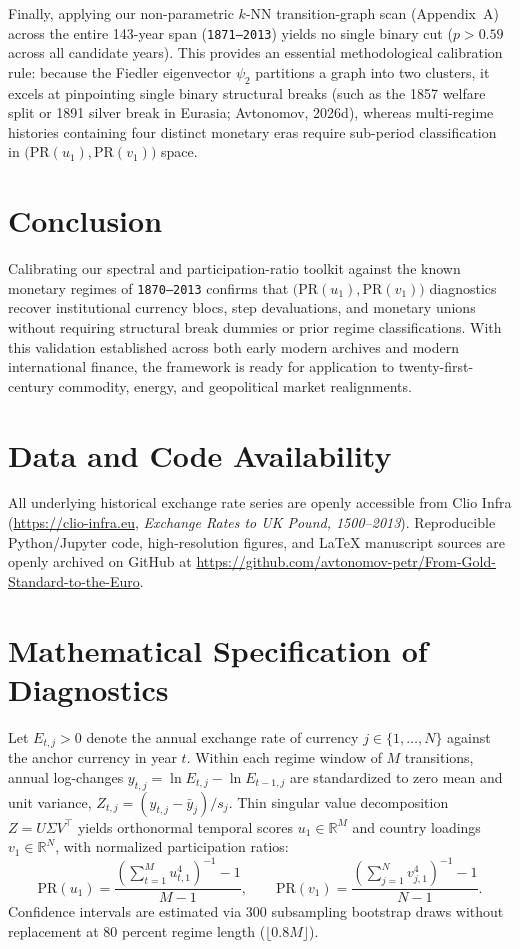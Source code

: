 \documentclass[11pt,a4paper]{article}
\begin{document}
Finally, applying our non-parametric $k$-NN transition-graph scan (Appendix~A) across the entire 143-year span (\texttt{1871--2013}) yields no single binary cut ($p > 0.59$ across all candidate years). This provides an essential methodological calibration rule: because the Fiedler eigenvector $\psi_2$ partitions a graph into two clusters, it excels at pinpointing single binary structural breaks (such as the 1857 welfare split or 1891 silver break in Eurasia; Avtonomov, 2026d), whereas multi-regime histories containing four distinct monetary eras require sub-period classification in $\big(\mathrm{PR}(u_1), \mathrm{PR}(v_1)\big)$ space.

\section{Conclusion}

Calibrating our spectral and participation-ratio toolkit against the known monetary regimes of \texttt{1870--2013} confirms that $\big(\mathrm{PR}(u_1), \mathrm{PR}(v_1)\big)$ diagnostics recover institutional currency blocs, step devaluations, and monetary unions without requiring structural break dummies or prior regime classifications. With this validation established across both early modern archives and modern international finance, the framework is ready for application to twenty-first-century commodity, energy, and geopolitical market realignments.

\section*{Data and Code Availability}
All underlying historical exchange rate series are openly accessible from Clio Infra (\url{https://clio-infra.eu}, \emph{Exchange Rates to UK Pound, 1500--2013}). Reproducible Python/Jupyter code, high-resolution figures, and LaTeX manuscript sources are openly archived on GitHub at \url{https://github.com/avtonomov-petr/From-Gold-Standard-to-the-Euro}.

\appendix
\section{Mathematical Specification of Diagnostics}
Let $E_{t,j} > 0$ denote the annual exchange rate of currency $j \in \{1,\dots,N\}$ against the anchor currency in year $t$. Within each regime window of $M$ transitions, annual log-changes $y_{t,j} = \ln E_{t,j} - \ln E_{t-1,j}$ are standardized to zero mean and unit variance, $Z_{t,j} = (y_{t,j} - \bar{y}_j)/s_j$. Thin singular value decomposition $Z = U \Sigma V^\top$ yields orthonormal temporal scores $u_1 \in \mathbb{R}^M$ and country loadings $v_1 \in \mathbb{R}^N$, with normalized participation ratios:
\begin{equation}
\mathrm{PR}(u_1) = \frac{\left(\sum_{t=1}^M u_{t,1}^4\right)^{-1} - 1}{M - 1}, \qquad
\mathrm{PR}(v_1) = \frac{\left(\sum_{j=1}^N v_{j,1}^4\right)^{-1} - 1}{N - 1}.
\end{equation}
Confidence intervals are estimated via 300 subsampling bootstrap draws without replacement at 80 percent regime length ($\lfloor 0.8M \rfloor$).
\end{document}
